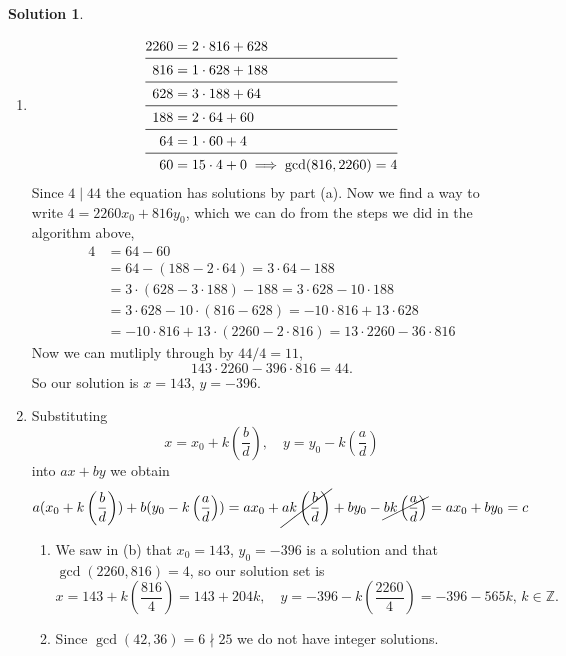 \documentclass[10pt]{article}
\theoremstyle{definition}
\newtheorem{soln}{Solution}
\begin{document}
\begin{soln}
\begin{enumerate}[label=(\alph*)]
    \item \begin{align*}
            2260 & =2\cdot816+628                       \\
            \midrule
            816  & =1\cdot628+188                       \\
            \midrule
            628  & =3\cdot188+64                        \\
            \midrule
            188  & =2\cdot64+60                         \\
            \midrule
            64   & =1\cdot60+4                          \\
            \midrule
            60   & =15\cdot4+0\implies \gcd(816,2260)=4
          \end{align*}
          Since $4\mid 44$ the equation has solutions by part (a). Now we find a way to write $4=2260x_0+816y_0$, which we can do from the
          steps we did in the algorithm above,
          \begin{align*}
            4 & =64-60                                                      \\
              & =64-(188-2\cdot64)=3\cdot64-188                             \\
              & =3\cdot(628-3\cdot188)-188=3\cdot628-10\cdot188             \\
              & =3\cdot628-10\cdot(816-628)=-10\cdot816+13\cdot628          \\
              & =-10\cdot816+13\cdot(2260-2\cdot816)=13\cdot2260-36\cdot816
          \end{align*}
          Now we can mutliply through by $44/4=11$,
          $$143\cdot2260-396\cdot816=44.$$
          So our solution is $x=143$, $y=-396$.
    \item Substituting $$x=x_0+k\left(\frac{b}{d}\right),\quad y=y_0-k\left(\frac{a}{d}\right)$$
          into $ax+by$ we obtain
          $$a(x_0+k\left(\frac{b}{d}\right))+b(y_0-k\left(\frac{a}{d}\right))=ax_0+\cancel{ak\left(\frac{b}{d}\right)}+by_0-\cancel{bk\left(\frac{a}{d}\right)}=ax_0+by_0=c$$
          \begin{enumerate}[label=(\roman*)]
            \item We saw in (b) that $x_0=143$, $y_0=-396$ is a solution and that $\gcd(2260,816)=4$, so our solution set is
                  $$x=143+k\left(\frac{816}{4}\right)=143+204k,\quad y=-396-k\left(\frac{2260}{4}\right)=-396-565k,\, k\in\mathbb{Z}.$$
            \item Since $\gcd(42,36)=6\nmid 25$ we do not have integer solutions.

\end{enumerate}
\end{enumerate}
\end{soln}
\end{document}
